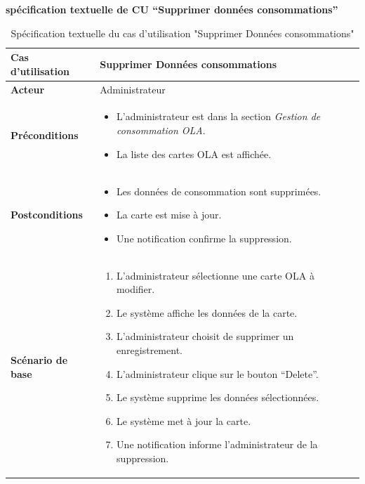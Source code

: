 \documentclass[a4paper,11pt]{report}
\begin{document}
\newpage
\textbf{spécification textuelle de CU “Supprimer données consommations”
}

\begin{table}[H]
  \centering
  \renewcommand{\arraystretch}{1.5}
  \caption{Spécification textuelle du cas d'utilisation "Supprimer Données consommations"}
  \begin{tabularx}{\textwidth}{|l|X|}
    \hline
    \textbf{Cas d'utilisation} & Supprimer Données consommations \\ \hline
    \textbf{Acteur} & Administrateur \\ \hline
    \textbf{Préconditions} & 
    \begin{itemize}
      \item L'administrateur est dans la section \textit{Gestion de consommation OLA}.
      \item La liste des cartes OLA est affichée.
    \end{itemize} \\ \hline
    \textbf{Postconditions} & 
    \begin{itemize}
      \item Les données de consommation sont supprimées.
      \item La carte est mise à jour.
      \item Une notification confirme la suppression.
    \end{itemize} \\ \hline
    \textbf{Scénario de base} & 
    \begin{enumerate}
      \item L’administrateur sélectionne une carte OLA à modifier.
      \item Le système affiche les données de la carte.
      \item L’administrateur choisit de supprimer un enregistrement.
      \item L’administrateur clique sur le bouton “Delete”.
      \item Le système supprime les données sélectionnées.
      \item Le système met à jour la carte.
      \item Une notification informe l’administrateur de la suppression.
    \end{enumerate} \\ \hline
  \end{tabularx}
\end{table}
\end{document}
